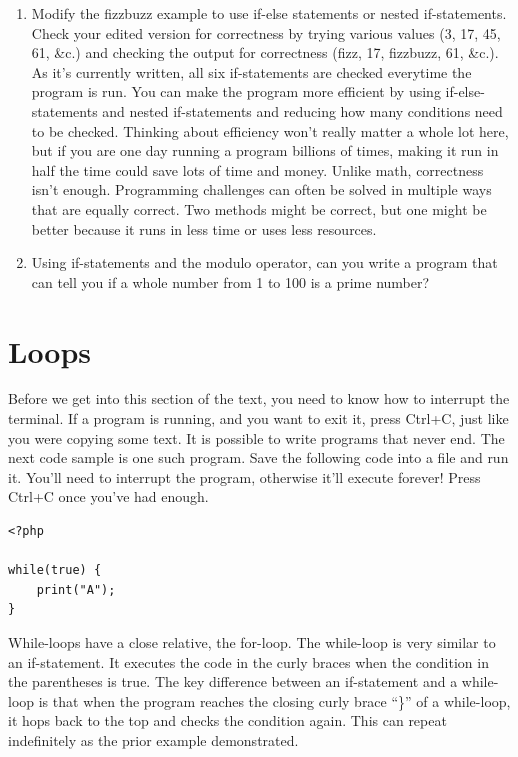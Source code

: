 \documentclass[
]{book}
\begin{document}
\begin{enumerate}
\def\labelenumi{\arabic{enumi}.}
\item
  Modify the fizzbuzz example to use if-else statements or nested if-statements. Check your edited version for correctness by trying various values (3, 17, 45, 61, \&c.) and checking the output for correctness (fizz, 17, fizzbuzz, 61, \&c.). As it's currently written, all six if-statements are checked everytime the program is run. You can make the program more efficient by using if-else-statements and nested if-statements and reducing how many conditions need to be checked. Thinking about efficiency won't really matter a whole lot here, but if you are one day running a program billions of times, making it run in half the time could save lots of time and money. Unlike math, correctness isn't enough. Programming challenges can often be solved in multiple ways that are equally correct. Two methods might be correct, but one might be better because it runs in less time or uses less resources.
\item
  Using if-statements and the modulo operator, can you write a program that can tell you if a whole number from 1 to 100 is a prime number?
\end{enumerate}

\hypertarget{loops}{%
\chapter{Loops}\label{loops}}

Before we get into this section of the text, you need to know how to interrupt the terminal. If a program is running, and you want to exit it, press Ctrl+C, just like you were copying some text. It is possible to write programs that never end. The next code sample is one such program. Save the following code into a file and run it. You'll need to interrupt the program, otherwise it'll execute forever! Press Ctrl+C once you've had enough.

\begin{verbatim}
<?php

while(true) {
    print("A");
}
\end{verbatim}

While-loops have a close relative, the for-loop. The while-loop is very similar to an if-statement. It executes the code in the curly braces when the condition in the parentheses is true. The key difference between an if-statement and a while-loop is that when the program reaches the closing curly brace ``\}'' of a while-loop, it hops back to the top and checks the condition again. This can repeat indefinitely as the prior example demonstrated.
\end{document}
